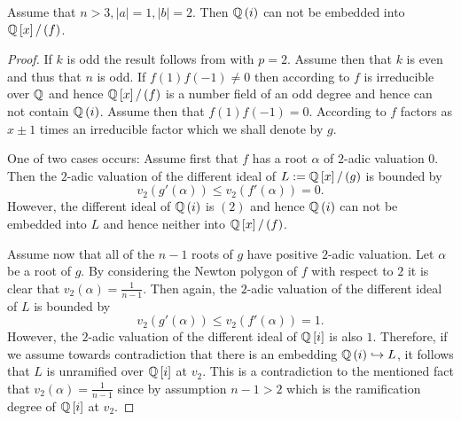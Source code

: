 \documentclass[../main.tex]{subfiles}
\begin{document}
\begin{lemma}
  \label{lem:Qi_not_embeddable_if_a1_b2}
  Assume that $n > 3, \left| a \right| = 1, \left| b \right| = 2$.
  Then $\mathbb{Q}\left( i \right)$ can not be embedded into $\mathbb{Q}\left[ x \right]/ \left( f \right)$.
\end{lemma}
\begin{proof}
  If $k$ is odd the result follows from  with $p = 2$.
  Assume then that $k$ is even and thus that $n$ is odd.
  If $f\left( 1 \right)f\left( -1 \right) \neq 0$ then according to  $f$ is irreducible over $\mathbb{Q}$ and hence $\mathbb{Q}\left[ x \right]/ \left( f \right)$ is a number field of an odd degree and hence can not contain $\mathbb{Q}\left( i \right)$.
  Assume then that $f\left( 1 \right)f\left( -1 \right) = 0$.
  According to  $f$ factors as $x \pm 1$ times an irreducible factor which we shall denote by $g$.

  One of two cases occurs:
  Assume first that $f$ has a root $\alpha$ of $2$-adic valuation $0$. 
  Then the $2$-adic valuation of the different ideal of $L := \mathbb{Q}\left[ x \right]/ \left( g \right)$ is bounded by 
  \[
    v_2\left( g'\left( \alpha \right) \right)
    \leq
    v_2\left( f'\left( \alpha \right) \right)
    =
    0.
  \]
  However, the different ideal of $\mathbb{Q}\left( i \right)$ is $\left( 2 \right)$ and hence $\mathbb{Q}\left( i \right)$ can not be embedded into $L$ and hence neither into $\mathbb{Q}\left[ x \right]/ \left( f \right)$.

  Assume now that all of the $n - 1$ roots of $g$ have positive $2$-adic valuation.
  Let $\alpha$ be a root of $g$.
  By considering the Newton polygon of $f$ with respect to $2$ it is clear that $v_2\left( \alpha \right) = \frac{1}{n - 1}$.
  Then again, the $2$-adic valuation of the different ideal of $L$ is bounded by 
  \[
    v_2\left( g'\left( \alpha \right) \right)
    \leq
    v_2\left( f'\left( \alpha \right) \right)
    =
    1.
  \]
  However, the $2$-adic valuation of the different ideal of $\mathbb{Q}\left[ i \right]$ is also $1$.
  Therefore, if we assume towards contradiction that there is an embedding $\mathbb{Q}\left( i \right) \hookrightarrow L$, it follows that $L$ is unramified over $\mathbb{Q}\left[ i \right]$ at $v_2$.
  This is a contradiction to the mentioned fact that $v_2\left( \alpha \right) = \frac{1}{n - 1}$ since by assumption $n - 1 > 2$ which is the ramification degree of $\mathbb{Q}\left[ i \right]$ at $v_2$.
\end{proof}
\end{document}
